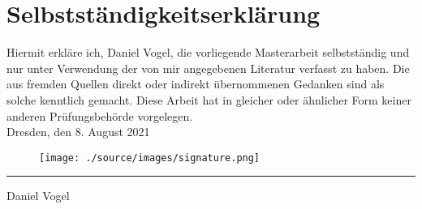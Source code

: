 \chapter*{Selbstständigkeitserklärung}
\thispagestyle{empty}

\noindent
Hiermit erkläre ich, Daniel Vogel, die vorliegende Masterarbeit selbstständig und nur unter Verwendung der von mir angegebenen Literatur verfasst zu haben. Die aus fremden Quellen direkt oder indirekt übernommenen Gedanken sind als solche kenntlich gemacht. Diese Arbeit hat in gleicher oder ähnlicher Form keiner anderen Prüfungsbehörde vorgelegen.\\[3em]

\noindent
Dresden, den 8. August 2021\\[1em]

\begin{figure}[h!]
    \texttt{[image: ./source/images/signature.png]}
\end{figure}

\par\noindent\rule{61.25pt}{0.5pt}

\noindent
Daniel Vogel
